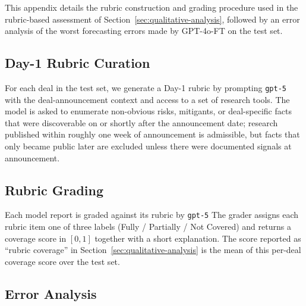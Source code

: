 \documentclass{article}
\theoremstyle{plain}
\theoremstyle{definition}
\theoremstyle{remark}
\begin{document}
This appendix details the rubric construction and grading procedure used in the rubric-based assessment of Section~\ref{sec:qualitative-analysis}, followed by an error analysis of the worst forecasting errors made by GPT-4o-FT on the test set.

\subsection{Day-1 Rubric Curation}
\label{app:rubric-curation}

For each deal in the test set, we generate a Day-1 rubric by prompting \texttt{gpt-5} with the deal-announcement context and access to a set of research tools. The model is asked to enumerate  non-obvious risks, mitigants, or deal-specific facts that were discoverable on or shortly after the announcement date; research published within roughly one week of announcement is admissible, but facts that only became public later are excluded unless there were documented signals at announcement.

\subsection{Rubric Grading}
\label{app:rubric-grading}

Each model report is graded against its rubric by \texttt{gpt-5} The grader assigns each rubric item one of three labels (Fully / Partially / Not Covered) and returns a coverage score in $[0,1]$ together with a short explanation. The score reported as ``rubric coverage'' in Section~\ref{sec:qualitative-analysis} is the mean of this per-deal coverage score over the test set.

\subsection{Error Analysis}
\label{app:error-analysis}
\end{document}
